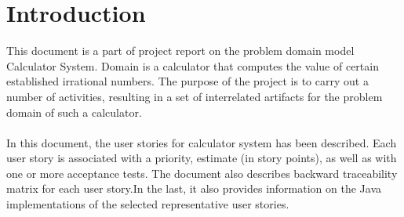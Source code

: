 \section{Introduction}

This document is a part of project report on the problem domain model Calculator System. Domain is a calculator that computes the value of certain established irrational numbers. The purpose of the project is to carry out a number of activities, resulting in a set of interrelated artifacts for the problem domain of such a calculator.\\ \\
In this document, the user stories for calculator system has been described. Each user story is associated with a priority, estimate (in story points), as well as with one or more acceptance tests. The document also describes backward traceability matrix for each user story.In the last, it also provides information on the Java implementations of the selected representative user stories.